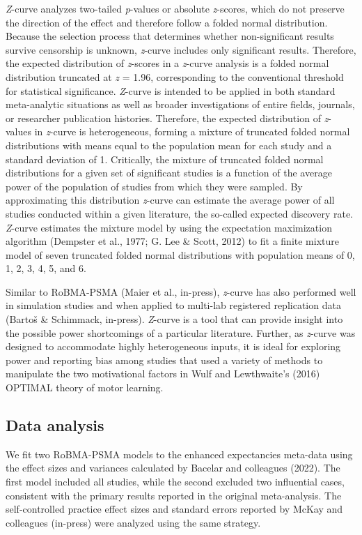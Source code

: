 \documentclass[
  doc, donotrepeattitle,floatsintext]{apa7}
\begin{document}
\emph{Z}-curve analyzes two-tailed \emph{p}-values or absolute \emph{z}-scores, which do not preserve the direction of the effect and therefore follow a folded normal distribution. Because the selection process that determines whether non-significant results survive censorship is unknown, \emph{z}-curve includes only significant results. Therefore, the expected distribution of \emph{z}-scores in a \emph{z}-curve analysis is a folded normal distribution truncated at \emph{z} = 1.96, corresponding to the conventional threshold for statistical significance. \emph{Z}-curve is intended to be applied in both standard meta-analytic situations as well as broader investigations of entire fields, journals, or researcher publication histories. Therefore, the expected distribution of \emph{z}-values in \emph{z}-curve is heterogeneous, forming a mixture of truncated folded normal distributions with means equal to the population mean for each study and a standard deviation of 1. Critically, the mixture of truncated folded normal distributions for a given set of significant studies is a function of the average power of the population of studies from which they were sampled. By approximating this distribution \emph{z}-curve can estimate the average power of all studies conducted within a given literature, the so-called expected discovery rate. \emph{Z}-curve estimates the mixture model by using the expectation maximization algorithm (Dempster et al., 1977; G. Lee \& Scott, 2012) to fit a finite mixture model of seven truncated folded normal distributions with population means of 0, 1, 2, 3, 4, 5, and 6.

Similar to RoBMA-PSMA (Maier et al., in-press), \emph{z}-curve has also performed well in simulation studies and when applied to multi-lab registered replication data (Bartoš \& Schimmack, in-press). \emph{Z}-curve is a tool that can provide insight into the possible power shortcomings of a particular literature. Further, as \emph{z}-curve was designed to accommodate highly heterogeneous inputs, it is ideal for exploring power and reporting bias among studies that used a variety of methods to manipulate the two motivational factors in Wulf and Lewthwaite's (2016) OPTIMAL theory of motor learning.

\hypertarget{data-analysis}{%
\subsection{Data analysis}\label{data-analysis}}

We fit two RoBMA-PSMA models to the enhanced expectancies meta-data using the effect sizes and variances calculated by Bacelar and colleagues (2022). The first model included all studies, while the second excluded two influential cases, consistent with the primary results reported in the original meta-analysis. The self-controlled practice effect sizes and standard errors reported by McKay and colleagues (in-press) were analyzed using the same strategy.
\end{document}

